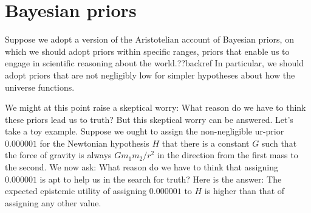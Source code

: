 \section{Bayesian priors}
Suppose we adopt a version of the Aristotelian account of Bayesian priors, on which we should adopt 
priors within specific ranges, priors that enable us to engage in scientific reasoning about the world.??backref
In particular, we should adopt priors that are not negligibly low for simpler hypotheses about how the universe 
functions. 

We might at this point raise a skeptical worry: What reason do we have to think these priors lead us to 
truth? But this skeptical worry can be answered. Let's take a toy example. Suppose we ought to assign 
the non-negligible ur-prior $0.000001$ for the Newtonian hypothesis $H$ that there is a constant $G$ such that 
the force of gravity is 
always $Gm_1m_2/r^2$ in the direction from the first mass to the second. We now ask: What reason do we
have to think that assigning $0.000001$  is apt to help us in the search for truth? Here is the answer: The expected 
epistemic utility of assigning $0.000001$  to $H$ is higher than that of assigning any other value.

